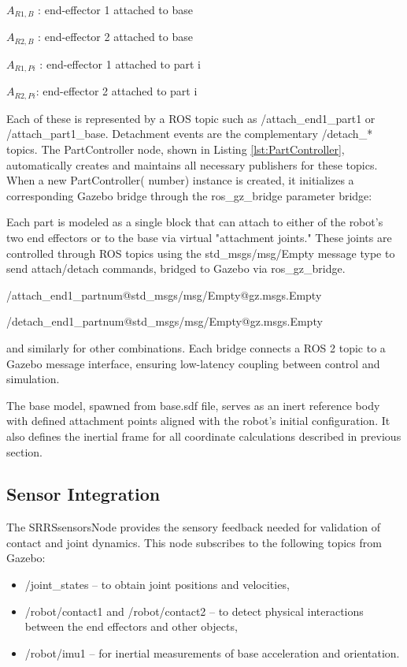 $A_{R1,B}$ : end-effector 1 attached to base

$ A_{R2,B}$ : end-effector 2 attached to base

$ A_{R1,Pi}$ : end-effector 1 attached to part i 

$ A_{R2,Pi} $: end-effector 2 attached to part i 

Each of these is represented by a ROS topic such as /attach\_end1\_part1 or 
/attach\_part1\_base. Detachment events are the complementary /detach\_* 
topics. 
The PartController node, shown in Listing \ref{lst:PartController},
automatically creates and maintains all 
necessary publishers for these topics. When a new PartController(
number) instance is created, it initializes a corresponding Gazebo bridge 
through the ros\_gz\_bridge parameter bridge:

Each part is modeled as a single block that can 
attach to either of the robot’s two end effectors or to the base via 
virtual "attachment joints." These joints are controlled through ROS 
topics using the std\_msgs/msg/Empty message type to send attach/detach 
commands, bridged to Gazebo via ros\_gz\_bridge.

/attach\_end1\_part{num}@std\_msgs/msg/Empty@gz.msgs.Empty 

/detach\_end1\_part{num}@std\_msgs/msg/Empty@gz.msgs.Empty 

and similarly for other combinations. Each bridge connects a ROS 2 
topic to a Gazebo message interface, ensuring low-latency coupling between 
control and simulation.

The base model, spawned from  base.sdf file, serves as an inert reference body with defined 
attachment points aligned with the robot's initial configuration. 
It also defines the inertial frame for all coordinate calculations 
described in previous section.

\subsection{Sensor Integration}

The SRRSsensorsNode provides the sensory feedback needed for validation of 
contact and joint dynamics. This node subscribes to the following topics from
Gazebo:
\begin{itemize}
    
   \item /joint\_states – to obtain joint positions and velocities,

   \item /robot/contact1 and /robot/contact2 – to detect physical interactions between the end effectors and other objects,

   \item /robot/imu1 – for inertial measurements of base acceleration and orientation.
\end{itemize}

